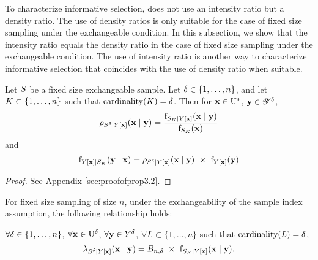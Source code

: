 To characterize informative selection, \cite{pfeffermann} does not use an intensity ratio but a density ratio. The use of density ratios is only suitable for the case of fixed size sampling under the exchangeable condition. In this subsection, we show that the intensity ratio equals the density ratio in the case of fixed size sampling under the exchangeable condition. The use of intensity ratio is another way to characterize informative selection that coincides with the use of density ratio when suitable.


\begin{property}\label{prop:oijsosdsdidfj}
Let $S$ be a fixed size exchangeable sample. Let $\delta \in\{1,\ldots,n\}$, and let $K\subset\{1,\ldots,n\}$ such that $\mathrm{cardinality}(K)=\delta$.
Then for $\mathbf{x}\in\mathrm{U}^\delta$, $\mathbf{y}\in\mathscr{Y}^\delta$,
\begin{equation}\rho_{S^\delta\mid Y[\mathbf{x}]}(\mathbf{x}\mid\mathbf{y})=\frac{\mathrm{f}_{S_K \mid Y[\mathbf{x}]}(\mathbf{x}\mid\mathbf{y})}{\mathrm{f}_{S_K }(\mathbf{x})}\end{equation}
and 
\begin{equation}
\mathrm{f}_{Y[\mathbf{x}]\mid S_K }(\mathbf{y}\mid\mathbf{x})=
\rho_{S^\delta\mid Y[\mathbf{x}]}(\mathbf{x}\mid\mathbf{y})~\times~\mathrm{f}_{Y[\mathbf{x}]}(\mathbf{y})
\end{equation}

\end{property}
\begin{proof}
See Appendix \ref{sec:proofofprop3.2}.
\end{proof}

\begin{property}
For fixed size sampling of size $n$, under the exchangeability of the sample index assumption, the following relationship holds:

$\forall \delta\in\{1,\ldots,n\}$, 
$\forall \mathbf{x}\in\mathrm{U}^\delta$, 
$\forall \mathbf{y}\in Y^\delta$, 
$\forall L\subset \{1,\ldots,n\}$ such that 
$\mathrm{cardinality}(L)=\delta$, 
$$\lambda_{S^\delta\mid Y[\mathbf{x}]}(\mathbf{x}\mid \mathbf{y})=
B_{n,\delta}~\times~\mathrm{f}_{S_K \mid Y[\mathbf{x}]}(\mathbf{x}\mid \mathbf{y}).$$
\end{property}

